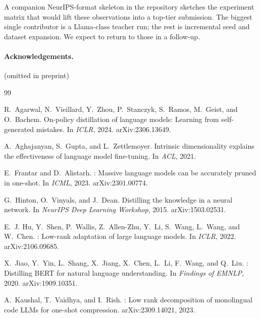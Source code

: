\documentclass[11pt]{article}
\begin{document}
A companion NeurIPS-format skeleton in the repository sketches the
experiment matrix that would lift these observations into a top-tier
submission. The biggest single contributor is a Llama-class teacher
run; the rest is incremental seed and dataset expansion. We expect to
return to those in a follow-up.

\paragraph{Acknowledgements.} (omitted in preprint)


\begingroup
\sloppy\raggedright{}
\begin{thebibliography}{99}\small

R.~Agarwal, N.~Vieillard, Y.~Zhou, P.~Stanczyk, S.~Ramos, M.~Geist, and
  O.~Bachem.
\newblock On-policy distillation of language models: Learning from
  self-generated mistakes.
\newblock In \emph{ICLR}, 2024. arXiv:2306.13649.

A.~Aghajanyan, S.~Gupta, and L.~Zettlemoyer.
\newblock Intrinsic dimensionality explains the effectiveness of language
  model fine-tuning.
\newblock In \emph{ACL}, 2021.

E.~Frantar and D.~Alistarh.
: Massive language models can be accurately pruned in
  one-shot.
\newblock In \emph{ICML}, 2023. arXiv:2301.00774.

G.~Hinton, O.~Vinyals, and J.~Dean.
\newblock Distilling the knowledge in a neural network.
\newblock In \emph{NeurIPS Deep Learning Workshop}, 2015. arXiv:1503.02531.

E.~J. Hu, Y.~Shen, P.~Wallis, Z.~Allen-Zhu, Y.~Li, S.~Wang, L.~Wang, and
  W.~Chen.
: Low-rank adaptation of large language models.
\newblock In \emph{ICLR}, 2022. arXiv:2106.09685.

X.~Jiao, Y.~Yin, L.~Shang, X.~Jiang, X.~Chen, L.~Li, F.~Wang, and Q.~Liu.
: Distilling {BERT} for natural language understanding.
\newblock In \emph{Findings of EMNLP}, 2020. arXiv:1909.10351.

A.~Kaushal, T.~Vaidhya, and I.~Rish.
: Low rank decomposition of monolingual code {LLMs} for
  one-shot compression.
\newblock arXiv:2309.14021, 2023.


\end{thebibliography}
\end{document}
